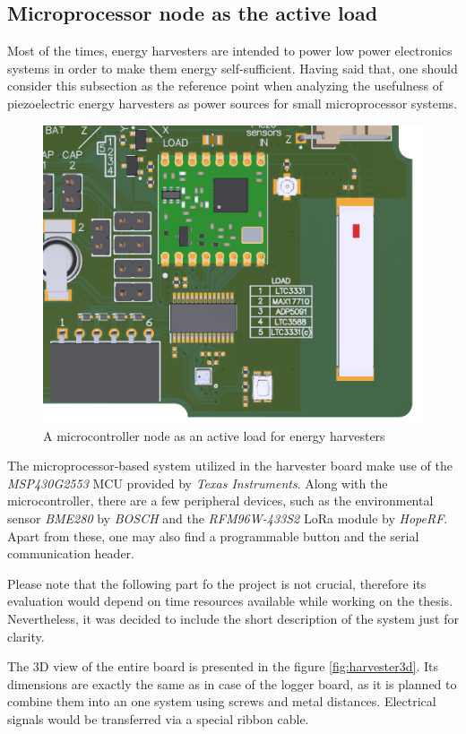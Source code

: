 \documentclass[12pt,a4paper]{article}
\begin{document}
\subsection{Microprocessor node as the active load}
Most of the times, energy harvesters are intended to power low power electronics systems in order to make them energy self-sufficient. Having said that, one should consider this subsection as the reference point when analyzing the usefulness of piezoelectric energy harvesters as power sources for small microprocessor systems. \par
\begin{figure}[ht!]
\includegraphics[scale=0.55]{activeload.png}
\caption{A microcontroller node as an active load for energy harvesters}
\label{fig:activeload}
\end{figure}
The microprocessor-based system utilized in the harvester board make use of the \textit{MSP430G2553} MCU provided by \textit{Texas Instruments}. Along with the microcontroller, there are a few peripheral devices, such as the environmental sensor \textit{BME280} by \textit{BOSCH} and the \textit{RFM96W-433S2} LoRa module by \textit{HopeRF}. Apart from these, one may also find a programmable button and the serial communication header.
\par
Please note that the following part fo the project is not crucial, therefore its evaluation would depend on time resources available while working on the thesis. Nevertheless, it was decided to include the short description of the system just for clarity.
\par
The 3D view of the entire board is presented in the figure \ref{fig:harvester3d}. Its dimensions are exactly the same as in case of the logger board, as it is planned to combine them into an one system using screws and metal distances. Electrical signals would be transferred via a special ribbon cable.
\end{document}
